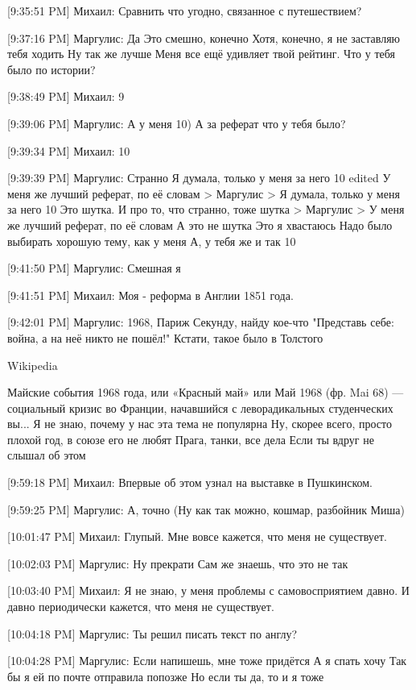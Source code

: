 \documentclass{article}
\begin{document}
[9:35:51 PM] Михаил:
Сравнить что угодно, связанное с путешествием?

[9:37:16 PM] Маргулис:
Да
 Это смешно, конечно
 Хотя, конечно, я не заставляю тебя ходить
 Ну так же лучше
 Меня все ещё удивляет твой рейтинг. Что у тебя было по истории?

[9:38:49 PM] Михаил:
9

[9:39:06 PM] Маргулис:
А у меня 10)
 А за реферат что у тебя было?

[9:39:34 PM] Михаил:
10

[9:39:39 PM] Маргулис:
Странно
 Я думала, только у меня за него 10
edited 
У меня же лучший реферат, по её словам
> Маргулис
> Я думала, только у меня за него 10
Это шутка. И про то, что странно, тоже шутка
> Маргулис
> У меня же лучший реферат, по её словам
А это не шутка
 Это я хвастаюсь
 Надо было выбирать хорошую тему, как у меня
 А, у тебя же и так 10

[9:41:50 PM] Маргулис:
Смешная я

[9:41:51 PM] Михаил:
Моя - реформа в Англии 1851 года.

[9:42:01 PM] Маргулис:
1968, Париж
 Секунду, найду кое-что
 "Представь себе: война, а на неё никто не пошёл!"
 Кстати, такое было в Толстого

Wikipedia

Майские события 1968 года, или «Красный май» или Май 1968 (фр. Mai 68) — социальный кризис во Франции, начавшийся с леворадикальных студенческих вы...
 Я не знаю, почему у нас эта тема не популярна
 Ну, скорее всего, просто плохой год, в союзе его не любят
 Прага, танки, все дела
 Если ты вдруг не слышал об этом

[9:59:18 PM] Михаил:
Впервые об этом узнал на выставке в Пушкинском.

[9:59:25 PM] Маргулис:
А, точно
 (Ну как так можно, кошмар, разбойник Миша)

[10:01:47 PM] Михаил:
Глупый. Мне вовсе кажется, что меня не существует.

[10:02:03 PM] Маргулис:
Ну прекрати
 Сам же знаешь, что это не так

[10:03:40 PM] Михаил:
Я не знаю, у меня проблемы с самовосприятием давно.
 И давно периодически кажется, что меня не существует.

[10:04:18 PM] Маргулис:
Ты решил писать текст по англу?

[10:04:28 PM] Маргулис:
Если напишешь, мне тоже придётся
 А я спать хочу
 Так бы я ей по почте отправила попозже
 Но если ты да, то и я тоже
\end{document}
